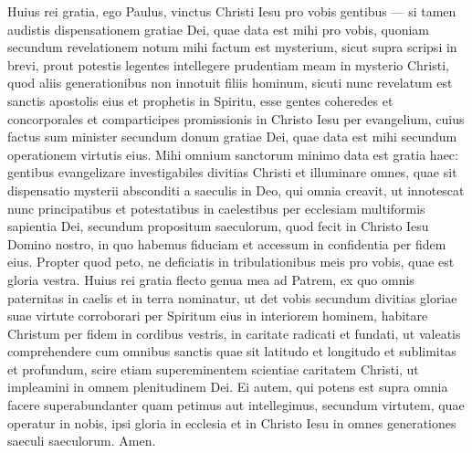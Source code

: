 \begin{biblechapter}
\begin{biblechapter}
\begin{biblechapter}
\verse Huius rei gratia, ego Paulus, vinctus Christi Iesu pro vobis gentibus — 
\verse si tamen audistis dispensationem gratiae Dei, quae data est mihi pro vobis, 
\verse quoniam secundum revelationem notum mihi factum est mysterium, sicut supra scripsi in brevi, 
\verse prout potestis legentes intellegere prudentiam meam in mysterio Christi, 
\verse quod aliis generationibus non innotuit filiis hominum, sicuti nunc revelatum est sanctis apostolis eius et prophetis in Spiritu, 
\verse esse gentes coheredes et concorporales et comparticipes promissionis in Christo Iesu per evangelium, 
\verse cuius factus sum minister secundum donum gratiae Dei, quae data est mihi secundum operationem virtutis eius. 
\verse Mihi omnium sanctorum minimo data est gratia haec: gentibus evangelizare investigabiles divitias Christi 
\verse et illuminare omnes, quae sit dispensatio mysterii absconditi a saeculis in Deo, qui omnia creavit, 
\verse ut innotescat nunc principatibus et potestatibus in caelestibus per ecclesiam multiformis sapientia Dei, 
\verse secundum propositum saeculorum, quod fecit in Christo Iesu Domino nostro, 
\verse in quo habemus fiduciam et accessum in confidentia per fidem eius. 
\verse Propter quod peto, ne deficiatis in tribulationibus meis pro vobis, quae est gloria vestra.
 \verse Huius rei gratia flecto genua mea ad Patrem, 
\verse ex quo omnis paternitas in caelis et in terra nominatur, 
\verse ut det vobis secundum divitias gloriae suae virtute corroborari per Spiritum eius in interiorem hominem, 
\verse habitare Christum per fidem in cordibus vestris, in caritate radicati et fundati, 
\verse ut valeatis comprehendere cum omnibus sanctis quae sit latitudo et longitudo et sublimitas et profundum, 
\verse scire etiam supereminentem scientiae caritatem Christi, ut impleamini in omnem plenitudinem Dei.
 \verse Ei autem, qui potens est supra omnia facere superabundanter quam petimus aut intellegimus, secundum virtutem, quae operatur in nobis, 
\verse ipsi gloria in ecclesia et in Christo Iesu in omnes generationes saeculi saeculorum. Amen.
 

\end{biblechapter}
\end{biblechapter}
\end{biblechapter}
